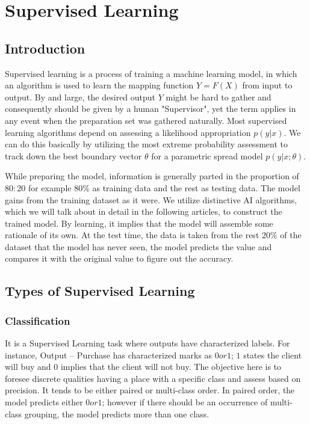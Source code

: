 \chapter{Supervised Learning}
\label{ch:Supervised Learning}
\section{Introduction}
Supervised learning is a process of training a machine learning model, in which an algorithm is used to learn the mapping function $Y= F(X)$ from input to output. By and large, the desired output $Y$ might be hard to gather and consequently should be given by a human "Supervisor", yet the term applies in any event when the preparation set was gathered naturally. Most supervised learning algorithms depend on assessing a likelihood appropriation $p(y|x)$. We can do this basically by utilizing the most extreme probability assessment to track down the best boundary vector $\theta$ for a parametric spread model $p(y|x;\theta)$.

While preparing the model, information is generally parted in the proportion of $80:20$ for example $80\%$ as training data and the rest as testing data. The model gains from the training dataset as it were. We utilize distinctive AI algorithms, which we will talk about in detail in the following articles, to construct the trained model. By learning, it implies that the model will assemble some rationale of its own. At the test time, the data is taken from the rest $20\%$ of the dataset that the model has never seen, the model predicts the value and compares it with the original value to figure out the accuracy.

\section{Types of Supervised Learning}
\subsection{Classification}
It is a Supervised Learning task where outputs have characterized labels. For instance, Output – Purchase has characterized marks as $0 or 1$; $1$ states the client will buy and $0$ implies that the client will not buy. The objective here is to foresee discrete qualities having a place with a specific class and assess based on precision. It tends to be either paired or multi-class order. In paired order, the model predicts either $0 or 1$; however if there should be an occurrence of multi-class grouping, the model predicts more than one class.

